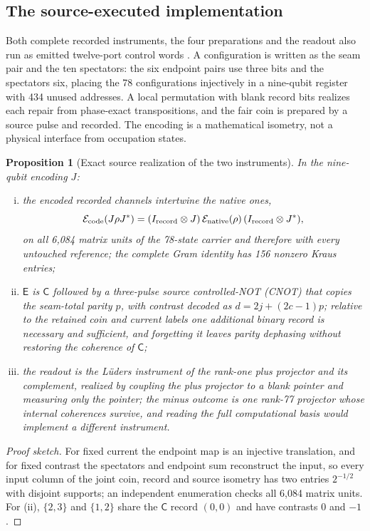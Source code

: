 \documentclass[11pt]{article}
\newtheorem{proposition}[theorem]{Proposition}
\theoremstyle{definition}
\theoremstyle{remark}
\theoremstyle{plain}
\newcommand{\Cn}{\mathsf{C}}
\newcommand{\En}{\mathsf{E}}
\begin{document}
\subsection{The source-executed implementation}
\label{sec:ce-source}

Both complete recorded instruments, the four preparations and the readout
also run as emitted twelve-port control words \cite{sdREADME,sdDERIV}. A
configuration is written as the seam pair and the ten spectators: the six
endpoint pairs use three bits and the spectators six, placing the 78
configurations injectively in a nine-qubit register with 434 unused
addresses. A local permutation with blank record bits realizes each repair
from phase-exact transpositions, and the fair coin is prepared by a source
pulse and recorded. The encoding is a mathematical isometry, not a physical
interface from occupation states.

\begin{proposition}[Exact source realization of the two instruments]
\label{prop:ce-source}
In the nine-qubit encoding $J$:
\begin{enumerate}[(i)]
\item the encoded recorded channels intertwine the native ones,
\[
\mathcal E_{\rm code}(J\rho J^*)=(I_{\rm record}\otimes J)\,
\mathcal E_{\rm native}(\rho)\,(I_{\rm record}\otimes J^*),
\]
on all 6,084 matrix units of the 78-state carrier and therefore with every
untouched reference; the complete Gram identity has 156 nonzero Kraus
entries;
\item $\En$ is $\Cn$ followed by a three-pulse source controlled-NOT (CNOT) that copies the
seam-total parity $p$, with contrast decoded as $d=2j+(2c-1)p$; relative to
the retained coin and current labels one additional binary record is
necessary and sufficient, and forgetting it leaves parity dephasing without
restoring the coherence of $\Cn$;
\item the readout is the L\"uders instrument \cite{luders1950} of the
rank-one plus projector and its complement, realized by coupling the plus
projector to a blank pointer and measuring only the pointer; the minus
outcome is one rank-77 projector whose internal coherences survive, and
reading the full computational basis would implement a different
instrument.
\end{enumerate}
\end{proposition}

\begin{proof}[Proof sketch]
For fixed current the endpoint map is an injective translation, and for fixed
contrast the spectators and endpoint sum reconstruct the input, so every
input column of the joint coin, record and source isometry has two entries
$2^{-1/2}$ with disjoint supports; an independent enumeration checks all
6,084 matrix units. For (ii), $\{2,3\}$ and $\{1,2\}$ share the $\Cn$ record
$(0,0)$ and have contrasts $0$ and $-1$ \cite{sdDERIV}.
\end{proof}
\end{document}
